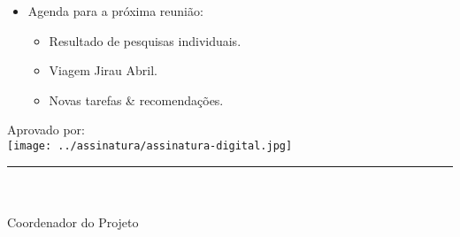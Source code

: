 \begin{itemize}

  \item Agenda para a próxima reunião:
  \begin{itemize}
    \item Resultado de pesquisas individuais.
    \item Viagem Jirau Abril.
    \item Novas tarefas \& recomendações.
  \end{itemize}

\end{itemize}

\vspace{5mm}%
\parbox[t]{70mm}{
  Aprovado por: \\[5mm]
  \centering
  \texttt{[image: ../assinatura/assinatura-digital.jpg]} \\[-4mm]
  \rule[2mm]{70mm}{0.1mm} \\
  \ramon \\[1mm]
  Coordenador do Projeto \\
}

\fim


